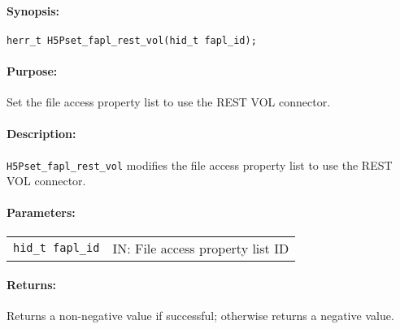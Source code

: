 \documentclass[../users_guide.tex]{subfiles}
\begin{document}
\paragraph{Synopsis:}
\begin{flushleft}%
\begin{verbatim}
herr_t H5Pset_fapl_rest_vol(hid_t fapl_id);
\end{verbatim}
\end{flushleft}%

\paragraph{Purpose:}
\begin{flushleft}%
Set the file access property list to use the REST VOL connector.
\end{flushleft}%

\paragraph{Description:}
\begin{flushleft}%
\texttt{H5Pset\_fapl\_rest\_vol} modifies the file access property list to use the
REST VOL connector.
\end{flushleft}%

\paragraph{Parameters:}
\begin{flushleft}%
 \begin{tabular}{ll}%
   \texttt{hid\_t fapl\_id} & IN: File access property list ID \\
 \end{tabular}%
\end{flushleft}%

\paragraph{Returns:}
\begin{flushleft}%
Returns a non-negative value if successful; otherwise returns a negative value.
\end{flushleft}%
\end{document}
